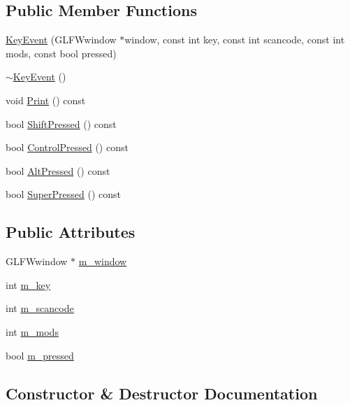 \subsection*{Public Member Functions}
\begin{DoxyCompactItemize}
\item 
\mbox{\hyperlink{structngl_1_1_key_event_a0c63e110b72e3c1235d883006c5c42b1}{Key\+Event}} (G\+L\+F\+Wwindow $\ast$window, const int key, const int scancode, const int mods, const bool pressed)
\item 
\mbox{\hyperlink{structngl_1_1_key_event_a69ed6149a7a1cfd0fa4f904d3b398988}{$\sim$\+Key\+Event}} ()
\item 
void \mbox{\hyperlink{structngl_1_1_key_event_a60e707188b3453722ac5c89741e9ebda}{Print}} () const
\item 
bool \mbox{\hyperlink{structngl_1_1_key_event_aaec46fecbe5f4294ac8341dc9e1d8641}{Shift\+Pressed}} () const
\item 
bool \mbox{\hyperlink{structngl_1_1_key_event_a44df9348ce0fd15fefc7c09b5eb2026d}{Control\+Pressed}} () const
\item 
bool \mbox{\hyperlink{structngl_1_1_key_event_a38f7dd68a0fa727492d1861c4958418f}{Alt\+Pressed}} () const
\item 
bool \mbox{\hyperlink{structngl_1_1_key_event_ad91b7d74e46c125a0da9c4fe6f9380a4}{Super\+Pressed}} () const
\end{DoxyCompactItemize}
\subsection*{Public Attributes}
\begin{DoxyCompactItemize}
\item 
G\+L\+F\+Wwindow $\ast$ \mbox{\hyperlink{structngl_1_1_key_event_a9d9dce7f11631abfb6bb111147c341e5}{m\+\_\+window}}
\item 
int \mbox{\hyperlink{structngl_1_1_key_event_a91edd479a5340c636fe6f903e66d5cde}{m\+\_\+key}}
\item 
int \mbox{\hyperlink{structngl_1_1_key_event_a014927021252e7e6cd551878bd805b79}{m\+\_\+scancode}}
\item 
int \mbox{\hyperlink{structngl_1_1_key_event_ac36aced851ae12568a9ec7270c54a530}{m\+\_\+mods}}
\item 
bool \mbox{\hyperlink{structngl_1_1_key_event_a7b663cea9c0f8164bb682ad03fa44f71}{m\+\_\+pressed}}
\end{DoxyCompactItemize}


\subsection{Constructor \& Destructor Documentation}
\mbox{\label{structngl_1_1_key_event_a0c63e110b72e3c1235d883006c5c42b1}} 
